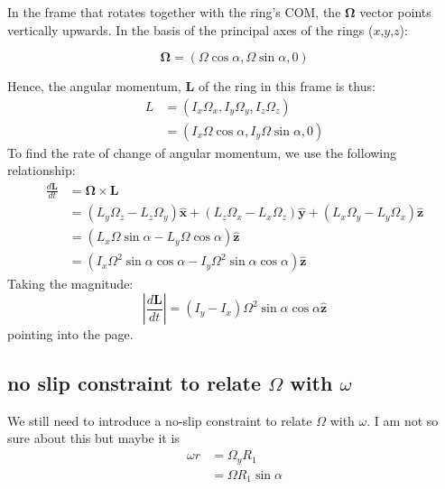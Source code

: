 \documentclass{scrartcl}
\begin{document}
In the frame that rotates together with the ring's COM, the $\mathbf{\Omega}$ vector points vertically upwards. In the basis of the principal axes of the rings ($x$,$y$,$z$):

\begin{equation}
    \mathbf{\Omega}=(\Omega\cos\alpha,\Omega\sin\alpha,0)
\end{equation}

Hence, the angular momentum, $\mathbf{L}$ of the ring in this frame is thus:
\begin{equation}
    \begin{aligned}
        L & =(I_x\Omega_x,I_y\Omega_y,I_z\Omega_z)       \\
          & =(I_x\Omega\cos\alpha,I_y\Omega\sin\alpha,0)
    \end{aligned}
\end{equation}
To find the rate of change of angular momentum, we use the following relationship:
\begin{equation}
    \begin{aligned}
        \frac{d\mathbf{L}}{dt} & =\mathbf{\Omega}\times\mathbf{L}                                                   \\
                               & =(L_y\Omega_z-L_z\Omega_y)\mathbf{\hat{x}}+
        (L_z\Omega_x-L_x\Omega_z)\mathbf{\hat{y}}+
        (L_x\Omega_y-L_y\Omega_x)\mathbf{\hat{z}}                                                                   \\
                               & = (L_x\Omega\sin\alpha-L_y\Omega\cos\alpha)\mathbf{\hat{z}}                        \\
                               & =(I_x\Omega^2\sin\alpha\cos\alpha-I_y\Omega^2\sin\alpha\cos\alpha)\mathbf{\hat{z}}
    \end{aligned}
\end{equation}
Taking the magnitude:
\begin{equation}
    \left| \frac{d\mathbf{L}}{dt} \right|=(I_y-I_x)\Omega^2\sin\alpha\cos\alpha\mathbf{\hat{z}}
\end{equation}
pointing into the page.

\subsection{no slip constraint to relate $\Omega$ with $\omega$}

We still need to introduce a no-slip constraint to relate $\Omega$ with $\omega$. I am not so sure about this but maybe it is
\begin{equation}
    \begin{aligned}
        \omega r & =  \Omega_y R_1         \\
                 & = \Omega R_1 \sin\alpha
    \end{aligned}
\end{equation}
\end{document}

